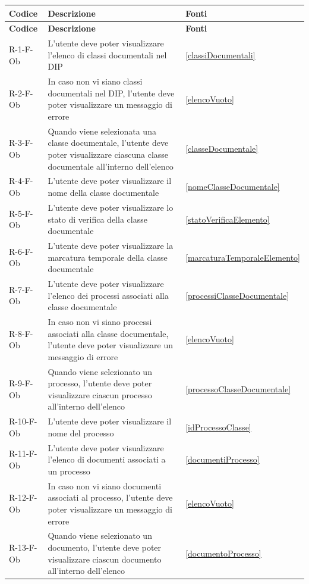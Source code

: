 \begin{longtable}{|p{2.5cm}|p{9.5cm}|p{2.5cm}|}
\hline
\rowcolor{zpusgreen!30}
\textbf{Codice} & \textbf{Descrizione} & \textbf{Fonti} \\
\hline
\endfirsthead
\rowcolor{zpusgreen!30}
\textbf{Codice} & \textbf{Descrizione} & \textbf{Fonti} \\
\hline
\endhead
R-1-F-Ob & L'utente deve poter visualizzare l'elenco di classi documentali nel DIP & \ref{classiDocumentali} \\
\hline
R-2-F-Ob & In caso non vi siano classi documentali nel DIP, l'utente deve poter visualizzare un messaggio di errore & \ref{elencoVuoto} \\
\hline
R-3-F-Ob & Quando viene selezionata una classe documentale, l'utente deve poter visualizzare ciascuna classe documentale all'interno dell'elenco & \ref{classeDocumentale} \\
\hline
R-4-F-Ob & L'utente deve poter visualizzare il nome della classe documentale & \ref{nomeClasseDocumentale} \\
\hline
R-5-F-Ob & L'utente deve poter visualizzare lo stato di verifica della classe documentale & \ref{statoVerificaElemento} \\
\hline
R-6-F-Ob & L'utente deve poter visualizzare la marcatura temporale della classe documentale & \ref{marcaturaTemporaleElemento} \\
\hline
R-7-F-Ob & L'utente deve poter visualizzare l'elenco dei processi associati alla classe documentale & \ref{processiClasseDocumentale} \\
\hline
R-8-F-Ob & In caso non vi siano processi associati alla classe documentale, l'utente deve poter visualizzare un messaggio di errore & \ref{elencoVuoto} \\
\hline
R-9-F-Ob & Quando viene selezionato un processo, l'utente deve poter visualizzare ciascun processo all'interno dell'elenco & \ref{processoClasseDocumentale} \\
\hline
R-10-F-Ob & L'utente deve poter visualizzare il nome del processo & \ref{idProcessoClasse} \\
\hline
R-11-F-Ob & L'utente deve poter visualizzare l'elenco di documenti associati a un processo & \ref{documentiProcesso} \\
\hline
R-12-F-Ob & In caso non vi siano documenti associati al processo, l'utente deve poter visualizzare un messaggio di errore & \ref{elencoVuoto} \\
\hline
R-13-F-Ob & Quando viene selezionato un documento, l'utente deve poter visualizzare ciascun documento all'interno dell'elenco & \ref{documentoProcesso} \\

\end{longtable}

